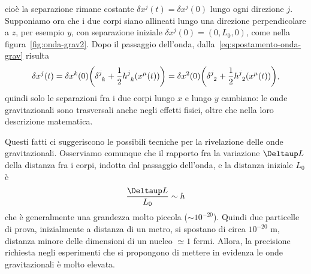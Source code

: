 cioè la separazione rimane costante $\delta x^{j}(t) = \delta x^{j}(0)$ lungo
ogni direzione $j$.  Supponiamo ora che i due corpi siano allineati lungo una
direzione perpendicolare a $z$, per esempio $y$, con separazione iniziale
$\delta x^{j}(0) = (0,L_{0},0)$, come nella figura~\ref{fig:onda-grav2}.  Dopo
il passaggio dell'onda, dalla~\eqref{eq:spostamento-onda-grav} risulta
\begin{equation}
  \delta x^{j}(t) = \delta x^{k}(0) \bigg(\tensor{\delta}{^{j}_{k}} +
  \frac{1}{2}\tensor{h}{^{j}_{k}}(x^{\mu}(t))\bigg) = \delta
  x^{2}(0)\bigg(\tensor{\delta}{^{j}_{2}} +
  \frac{1}{2}\tensor{h}{^{j}_{2}}(x^{\mu}(t))\bigg),
\end{equation}
quindi solo le separazioni fra i due corpi lungo $x$ e lungo $y$ cambiano: le
onde gravitazionali sono trasversali anche negli effetti fisici, oltre che nella
loro descrizione matematica.

Questi fatti ci suggeriscono le possibili tecniche per la rivelazione delle onde
gravitazionali.  Osserviamo comunque che il rapporto fra la variazione $\var L$
della distanza fra i corpi, indotta dal passaggio dell'onda, e la distanza
iniziale $L_{0}$ è
\begin{equation}
  \frac{\var L}{L_{0}} \sim h
\end{equation}
che è generalmente una grandezza molto piccola ($\sim 10^{-20}$).  Quindi due
particelle di prova, inizialmente a distanza di un metro, si spostano di circa
$10^{-20}$ m, distanza minore delle dimensioni di un nucleo $\simeq 1$ fermi.
Allora, la precisione richiesta negli esperimenti che si propongono di mettere
in evidenza le onde gravitazionali è molto elevata.

